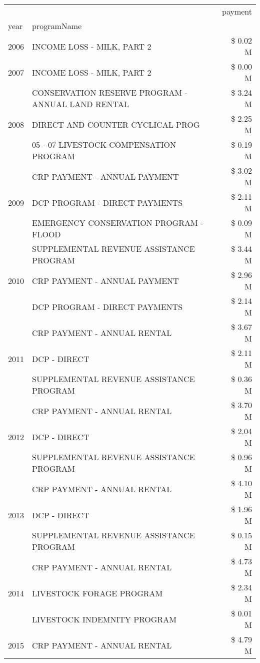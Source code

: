 \begin{tabular}{llr}
\toprule
 &  & payment \\
year & programName &  \\
\midrule
2006 & INCOME LOSS - MILK, PART 2 & \$ 0.02 M \\
\cline{1-3}
2007 & INCOME LOSS - MILK, PART 2 & \$ 0.00 M \\
\cline{1-3}
\multirow[t]{3}{*}{2008} & CONSERVATION RESERVE PROGRAM - ANNUAL LAND RENTAL & \$ 3.24 M \\
 & DIRECT AND COUNTER CYCLICAL PROG & \$ 2.25 M \\
 & 05 - 07 LIVESTOCK COMPENSATION PROGRAM & \$ 0.19 M \\
\cline{1-3}
\multirow[t]{3}{*}{2009} & CRP PAYMENT - ANNUAL PAYMENT & \$ 3.02 M \\
 & DCP PROGRAM - DIRECT PAYMENTS & \$ 2.11 M \\
 & EMERGENCY CONSERVATION PROGRAM - FLOOD & \$ 0.09 M \\
\cline{1-3}
\multirow[t]{3}{*}{2010} & SUPPLEMENTAL REVENUE ASSISTANCE PROGRAM & \$ 3.44 M \\
 & CRP PAYMENT - ANNUAL PAYMENT & \$ 2.96 M \\
 & DCP PROGRAM - DIRECT PAYMENTS & \$ 2.14 M \\
\cline{1-3}
\multirow[t]{3}{*}{2011} & CRP PAYMENT - ANNUAL RENTAL & \$ 3.67 M \\
 & DCP - DIRECT & \$ 2.11 M \\
 & SUPPLEMENTAL REVENUE ASSISTANCE PROGRAM & \$ 0.36 M \\
\cline{1-3}
\multirow[t]{3}{*}{2012} & CRP PAYMENT - ANNUAL RENTAL & \$ 3.70 M \\
 & DCP - DIRECT & \$ 2.04 M \\
 & SUPPLEMENTAL REVENUE ASSISTANCE PROGRAM & \$ 0.96 M \\
\cline{1-3}
\multirow[t]{3}{*}{2013} & CRP PAYMENT - ANNUAL RENTAL & \$ 4.10 M \\
 & DCP - DIRECT & \$ 1.96 M \\
 & SUPPLEMENTAL REVENUE ASSISTANCE PROGRAM & \$ 0.15 M \\
\cline{1-3}
\multirow[t]{3}{*}{2014} & CRP PAYMENT - ANNUAL RENTAL & \$ 4.73 M \\
 & LIVESTOCK FORAGE PROGRAM & \$ 2.34 M \\
 & LIVESTOCK INDEMNITY PROGRAM & \$ 0.01 M \\
\cline{1-3}
\multirow[t]{3}{*}{2015} & CRP PAYMENT - ANNUAL RENTAL & \$ 4.79 M \\

\end{tabular}
